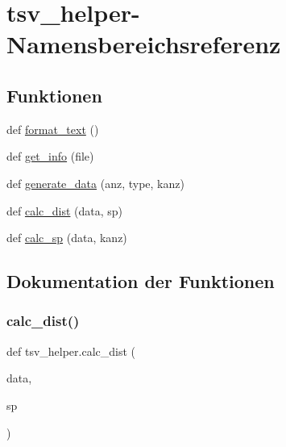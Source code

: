\hypertarget{namespacetsv__helper}{}\section{tsv\+\_\+helper-\/\+Namensbereichsreferenz}
\label{namespacetsv__helper}
\subsection*{Funktionen}
\begin{DoxyCompactItemize}
\item 
def \mbox{\hyperlink{namespacetsv__helper_ac423d79f26a11d76d23d6da87b7e5945}{format\+\_\+text}} ()
\item 
def \mbox{\hyperlink{namespacetsv__helper_a3ef6b7f1fb139a5c1291101cbd83a5ce}{get\+\_\+info}} (file)
\item 
def \mbox{\hyperlink{namespacetsv__helper_aaac50fa5ac9fbe9a50c232d043a2558e}{generate\+\_\+data}} (anz, type, kanz)
\item 
def \mbox{\hyperlink{namespacetsv__helper_a3776590318bc0b70888c9f8e6d771743}{calc\+\_\+dist}} (data, sp)
\item 
def \mbox{\hyperlink{namespacetsv__helper_a51dba510dd8fd8c73098fedfa03724b2}{calc\+\_\+sp}} (data, kanz)
\end{DoxyCompactItemize}


\subsection{Dokumentation der Funktionen}
\mbox{\label{namespacetsv__helper_a3776590318bc0b70888c9f8e6d771743}} 
\subsubsection{\texorpdfstring{calc\+\_\+dist()}{calc\_dist()}}
{\footnotesize\ttfamily def tsv\+\_\+helper.\+calc\+\_\+dist (\begin{DoxyParamCaption}\item[{}]{data,  }\item[{}]{sp }\end{DoxyParamCaption})}

\mbox{\label{namespacetsv__helper_a51dba510dd8fd8c73098fedfa03724b2}} 
